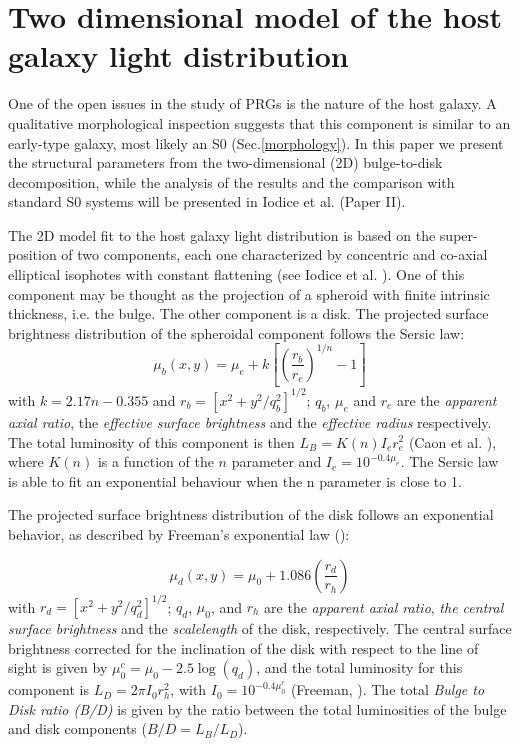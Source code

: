 \documentclass{aa}
\begin{document}
\section{Two dimensional model of the host galaxy light 
distribution}\label{2Dmodel}
One of the open issues in the study of PRGs is the nature
of the host galaxy. A qualitative morphological inspection suggests that
this component is similar to an early-type galaxy, most likely an S0
(Sec.\ref{morphology}). 
In this paper we present the structural parameters from the two-dimensional (2D)
bulge-to-disk decomposition, while the analysis of the results and the
comparison with standard S0 systems will be presented in Iodice et al. \cite{paperII} 
(Paper II). 
                                                    
The 2D model fit to the host galaxy light distribution 
is based on the super-position of two components,
each one characterized by concentric and co-axial elliptical isophotes with
constant flattening (see Iodice et al. \cite{Iodice2001}). 
One of this component may be thought as the projection of a
spheroid with finite intrinsic thickness, i.e. the bulge. The other
component is a disk.           
The projected surface brightness distribution of the spheroidal component 
follows the Sersic law:
\begin{equation}\label{sersic}
\mu_{b}(x,y)=\mu_{e}+k \left[\left(\frac{r_{b}}{r_{e}}\right)^{1/n}-1
\right]
\end{equation}
with $k=2.17n-0.355$ and $r_{b}=\left[{x^{2}+y^{2}/q_b^{2}}\right]^{1/2}$;
$q_{b}$, $\mu_{e}$ and $r_{e}$ are the {\it apparent axial ratio}, the
{\it effective surface brightness} and the {\it effective radius}
respectively. 
The total luminosity of this component is then $L_{B}=K(n) I_{e} r_{e}^2$ 
(Caon et al. \cite{caon93}), where $K(n)$ is a 
function of the $n$ parameter and $I_{e}= 10^{-0.4 \mu_{e}}$.
The Sersic law is able to fit an exponential behaviour when the n 
parameter is close to 1. 

The projected surface brightness distribution of the disk 
follows an exponential behavior, as described by Freeman's exponential 
law (\cite{freeman70}):

\begin{equation}\label{exp}
\mu_{d}(x,y)=\mu_{0}+1.086\left(\frac{r_{d}}{r_{h}}\right)
\end{equation}
with $r_{d}=\left[{x^{2}+y^{2}/q_d^{2}}\right]^{1/2}$; $q_{d}$,
$\mu_{0}$, and $r_{h}$ are the {\it apparent axial ratio},
{\it the central surface brightness} and the {\it scalelength} of the 
disk, respectively. The central surface brightness corrected for the 
inclination of the disk with respect to the line of sight is given by 
$\mu_{0}^{c}= \mu_{0}-2.5\log(q_{d})$, and the total luminosity for this 
component is  $L_{D}=2\pi I_{0} r_{h}^2$, with $I_{0}=10^{-0.4 \mu_{0}^{c}}$ 
(Freeman, \cite{freeman70}). 
The total {\it Bulge to Disk ratio (B/D)} is given by the ratio between the 
total luminosities of the bulge and disk components ($B/D=L_{B} / L_{D}$).
\end{document}
